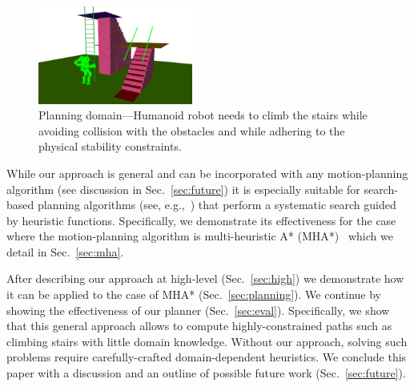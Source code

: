 \documentclass[conference]{IEEEtran}
\begin{document}
% 

\begin{figure}[tb]
  \centering
  	\includegraphics[width=0.453\textwidth]{fig/env.png}
  \caption{
		Planning domain---Humanoid robot needs to climb the stairs while avoiding collision with the obstacles and while adhering to the physical stability constraints.
  	\vspace{-15mm}
}
   	\label{fig:robot}
\end{figure}



%

While our approach is general and can be incorporated with any motion-planning algorithm (see discussion in Sec.~\ref{sec:future}) it is especially suitable for search-based planning algorithms (see, e.g.,~\cite{CCL14}) that perform a systematic search guided by heuristic functions.
Specifically, we demonstrate its effectiveness for the case where the motion-planning algorithm is multi-heuristic A* (MHA*)~\cite{ASNHL16, NAL15} which we detail in Sec.~\ref{sec:mha}.




After describing our approach at high-level (Sec.~\ref{sec:high}) we demonstrate how it can be applied to the case of MHA* (Sec.~\ref{sec:planning}).
We continue by showing the effectiveness of our planner (Sec.~\ref{sec:eval}).
Specifically, we show that this general approach allows to compute highly-constrained paths such as climbing stairs with little domain knowledge.
Without our approach, solving such problems require carefully-crafted domain-dependent heuristics. 
We conclude this paper with a discussion and an outline of possible future work (Sec.~\ref{sec:future}).
\end{document}

